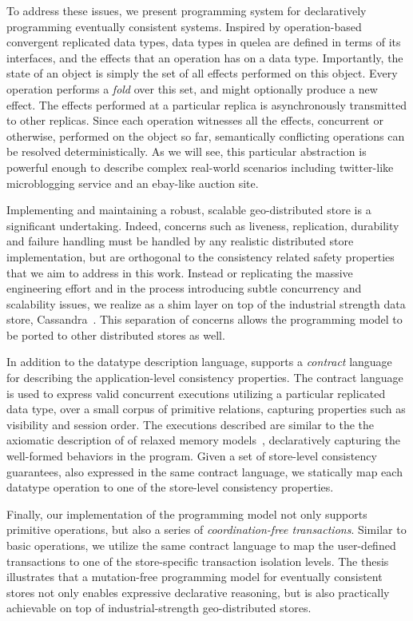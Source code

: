 To address these issues, we present \quelea programming system for
declaratively programming eventually consistent systems. Inspired by
operation-based convergent replicated data types, data types in quelea are
defined in terms of its interfaces, and the effects that an operation has on a
data type. Importantly, the state of an object is simply the set of all effects
performed on this object. Every operation performs a \emph{fold} over this set,
and might optionally produce a new effect. The effects performed at a
particular replica is asynchronously transmitted to other replicas. Since each
operation witnesses all the effects, concurrent or otherwise, performed on the
object so far, semantically conflicting operations can be resolved
deterministically. As we will see, this particular abstraction is powerful
enough to describe complex real-world scenarios including twitter-like
microblogging service and an ebay-like auction site.

Implementing and maintaining a robust, scalable geo-distributed store is a
significant undertaking. Indeed, concerns such as liveness, replication,
durability and failure handling must be handled by any realistic distributed
store implementation, but are orthogonal to the consistency related safety
properties that we aim to address in this work. Instead or replicating the
massive engineering effort and in the process introducing subtle concurrency
and scalability issues, we realize \quelea as a shim layer on top of the
industrial strength data store, Cassandra~\cite{Lakshman2010}. This separation
of concerns allows the \quelea programming model to be ported to other
distributed stores as well.

In addition to the datatype description language, \quelea supports a
\emph{contract} language for describing the application-level consistency
properties. The contract language is used to express valid concurrent
executions utilizing a particular replicated data type, over a small corpus of
primitive relations, capturing properties such as visibility and session order.
The executions described are similar to the the axiomatic description of of
relaxed memory models~\cite{Demange2013}, declaratively capturing the
well-formed behaviors in the program. Given a set of store-level consistency
guarantees, also expressed in the same contract language, we statically map
each datatype operation to one of the store-level consistency properties.

Finally, our implementation of the \quelea programming model not only supports
primitive operations, but also a series of \emph{coordination-free
transactions}. Similar to basic operations, we utilize the same contract
language to map the user-defined transactions to one of the store-specific
transaction isolation levels. The thesis illustrates that a mutation-free
programming model for eventually consistent stores not only enables expressive
declarative reasoning, but is also practically achievable on top of
industrial-strength geo-distributed stores.


